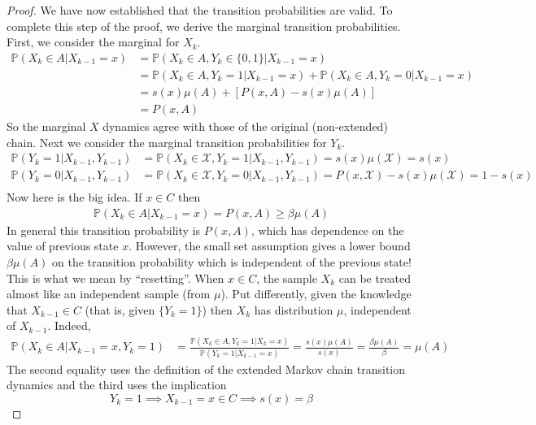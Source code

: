 \documentclass[12pt]{article}
\newcommand{\Prob}{\mathbb{P}}
\begin{document}
\begin{proof}
We have now established that the transition probabilities are valid. To complete this step of the proof, we derive the marginal transition probabilities. First, we consider the marginal for 
$X_k$. 
\begin{align*}
\Prob(X_k \in A|X_{k - 1} = x) &= \Prob(X_k \in A, Y_k \in \{0, 1\}| X_{k - 1} = x) \\
					     &= \Prob(X_k \in A, Y_k = 1| X_{k - 1} = x) + \Prob(X_k \in A, Y_k = 0| X_{k - 1} = x) \\
					     &= s(x)\mu(A) + \left[P(x, A) - s(x)\mu(A) \right] \\
					     &= P(x, A)
\end{align*}
So the marginal $X$ dynamics agree with those of the original (non-extended) chain. Next we consider the marginal transition probabilities for $Y_k$.
\begin{align*}
\Prob(Y_k = 1|X_{k-1}, Y_{k-1}) &= \Prob(X_k \in \mathcal{X}, Y_k = 1|X_{k-1}, Y_{k-1}) = s(x)\mu(\mathcal{X}) = s(x) \\
\Prob(Y_k = 0|X_{k-1}, Y_{k-1}) &= \Prob(X_k \in \mathcal{X}, Y_k = 0|X_{k-1}, Y_{k-1}) = P(x, \mathcal{X}) - s(x)\mu(\mathcal{X}) = 1- s(x) \\
\end{align*}
Now here is the big idea. If $x \in C$ then 
\begin{align*}
\Prob(X_k \in A|X_{k-1} = x) = P(x, A) \geq \beta \mu(A)
\end{align*}
In general this transition probability is $P(x, A)$, which has dependence on the value of previous state $x$. However, the small set assumption gives a lower bound $\beta \mu(A)$  on the transition 
probability which is independent of the previous state! This is what we mean by ``resetting''. When $x \in C$, the sample $X_k$ can be treated almost like an independent sample (from $\mu$). 
Put differently, given the knowledge that $X_{k-1} \in C$ (that is, given $\{Y_k = 1\}$) then $X_k$ has distribution $\mu$, independent of $X_{k - 1}$. Indeed, 
\begin{align}
\Prob(X_k \in A | X_{k - 1} = x, Y_k = 1) &= \frac{\Prob(X_k \in A, Y_k = 1| X_k = x)}{\Prob(Y_k = 1| X_{k - 1} = x)} = \frac{s(x) \mu(A)}{s(x)} = \frac{\beta \mu(A)}{\beta} = \mu(A) \label{fresh_sample}
\end{align}
The second equality uses the definition of the extended Markov chain transition dynamics and the third uses the implication 
\[Y_k = 1 \implies X_{k-1} = x \in C \implies s(x) = \beta\]



\end{proof}
\end{document}
